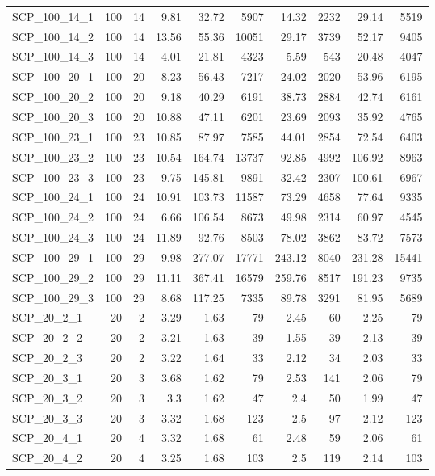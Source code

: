 \begin{center}
\begin{scriptsize}
\begin{longtable}{lrrrrrrrrr}
SCP\_100\_14\_1 & 100 & 14 & 9.81 & 32.72 & 5907 & 14.32 & 2232 & 29.14 & 5519\\
SCP\_100\_14\_2 & 100 & 14 & 13.56 & 55.36 & 10051 & 29.17 & 3739 & 52.17 & 9405\\
SCP\_100\_14\_3 & 100 & 14 & 4.01 & 21.81 & 4323 & 5.59 & 543 & 20.48 & 4047\\
SCP\_100\_20\_1 & 100 & 20 & 8.23 & 56.43 & 7217 & 24.02 & 2020 & 53.96 & 6195\\
SCP\_100\_20\_2 & 100 & 20 & 9.18 & 40.29 & 6191 & 38.73 & 2884 & 42.74 & 6161\\
SCP\_100\_20\_3 & 100 & 20 & 10.88 & 47.11 & 6201 & 23.69 & 2093 & 35.92 & 4765\\
SCP\_100\_23\_1 & 100 & 23 & 10.85 & 87.97 & 7585 & 44.01 & 2854 & 72.54 & 6403\\
SCP\_100\_23\_2 & 100 & 23 & 10.54 & 164.74 & 13737 & 92.85 & 4992 & 106.92 & 8963\\
SCP\_100\_23\_3 & 100 & 23 & 9.75 & 145.81 & 9891 & 32.42 & 2307 & 100.61 & 6967\\
SCP\_100\_24\_1 & 100 & 24 & 10.91 & 103.73 & 11587 & 73.29 & 4658 & 77.64 & 9335\\
SCP\_100\_24\_2 & 100 & 24 & 6.66 & 106.54 & 8673 & 49.98 & 2314 & 60.97 & 4545\\
SCP\_100\_24\_3 & 100 & 24 & 11.89 & 92.76 & 8503 & 78.02 & 3862 & 83.72 & 7573\\
SCP\_100\_29\_1 & 100 & 29 & 9.98 & 277.07 & 17771 & 243.12 & 8040 & 231.28 & 15441\\
SCP\_100\_29\_2 & 100 & 29 & 11.11 & 367.41 & 16579 & 259.76 & 8517 & 191.23 & 9735\\
SCP\_100\_29\_3 & 100 & 29 & 8.68 & 117.25 & 7335 & 89.78 & 3291 & 81.95 & 5689\\
SCP\_20\_2\_1 & 20 & 2 & 3.29 & 1.63 & 79 & 2.45 & 60 & 2.25 & 79\\
SCP\_20\_2\_2 & 20 & 2 & 3.21 & 1.63 & 39 & 1.55 & 39 & 2.13 & 39\\
SCP\_20\_2\_3 & 20 & 2 & 3.22 & 1.64 & 33 & 2.12 & 34 & 2.03 & 33\\
SCP\_20\_3\_1 & 20 & 3 & 3.68 & 1.62 & 79 & 2.53 & 141 & 2.06 & 79\\
SCP\_20\_3\_2 & 20 & 3 & 3.3 & 1.62 & 47 & 2.4 & 50 & 1.99 & 47\\
SCP\_20\_3\_3 & 20 & 3 & 3.32 & 1.68 & 123 & 2.5 & 97 & 2.12 & 123\\
SCP\_20\_4\_1 & 20 & 4 & 3.32 & 1.68 & 61 & 2.48 & 59 & 2.06 & 61\\
SCP\_20\_4\_2 & 20 & 4 & 3.25 & 1.68 & 103 & 2.5 & 119 & 2.14 & 103\\

\end{longtable}
\end{scriptsize}
\end{center}
